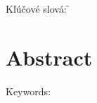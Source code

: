 

\medskip
\noindent
{\sc Kľúčové slová}: \mfkeywords
\f
\ifx\draft\undefined

 \chapter*{Abstract}





\medskip
\noindent
{\sc Keywords}: \mfkeywords
\fi


\tableofcontents
\listoftables
\listoffigures
